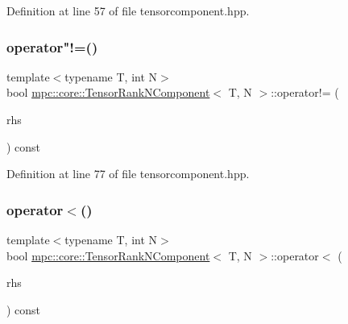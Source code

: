 Definition at line 57 of file tensorcomponent.\+hpp.

\mbox{\label{classmpc_1_1core_1_1_tensor_rank_n_component_aa3e7f1d6e679fe8d4a3f0242f5f20dfd}} 
\subsubsection{\texorpdfstring{operator"!=()}{operator!=()}}
{\footnotesize\ttfamily template$<$typename T, int N$>$ \\
bool \mbox{\hyperlink{classmpc_1_1core_1_1_tensor_rank_n_component}{mpc\+::core\+::\+Tensor\+Rank\+N\+Component}}$<$ T, N $>$\+::operator!= (\begin{DoxyParamCaption}\item[{const \mbox{\hyperlink{classmpc_1_1core_1_1_tensor_rank_n_component}{Tensor\+Rank\+N\+Component}}$<$ T, N $>$ \&}]{rhs }\end{DoxyParamCaption}) const\hspace{0.3cm}{\ttfamily [inline]}}



Definition at line 77 of file tensorcomponent.\+hpp.

\mbox{\label{classmpc_1_1core_1_1_tensor_rank_n_component_a06a52579da1cac23e406fa638f8c31c1}} 
\subsubsection{\texorpdfstring{operator$<$()}{operator<()}}
{\footnotesize\ttfamily template$<$typename T, int N$>$ \\
bool \mbox{\hyperlink{classmpc_1_1core_1_1_tensor_rank_n_component}{mpc\+::core\+::\+Tensor\+Rank\+N\+Component}}$<$ T, N $>$\+::operator$<$ (\begin{DoxyParamCaption}\item[{const \mbox{\hyperlink{classmpc_1_1core_1_1_tensor_rank_n_component}{Tensor\+Rank\+N\+Component}}$<$ T, N $>$ \&}]{rhs }\end{DoxyParamCaption}) const\hspace{0.3cm}{\ttfamily [inline]}}



